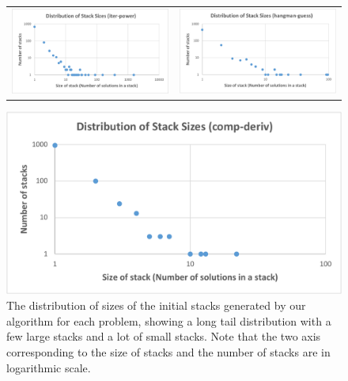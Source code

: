 \begin{figure}
\centering
\begin{tabular}{c c}
\includegraphics[scale=0.30]{Body/figures/overcode/stacksdistr-iter-power}
&
\includegraphics[scale=0.405]{Body/figures/overcode/stacksdistr-hangman}
\end{tabular}
\includegraphics[scale=0.38]{Body/figures/overcode/stacksdistr-comp-deriv}
\caption{The distribution of sizes of the initial stacks generated by our algorithm for each problem, showing a long tail distribution with a few large stacks and a lot of small stacks. Note that the two axis corresponding to the size of stacks and the number of stacks are in logarithmic scale.}
\label{stackdistribution}
\end{figure}

